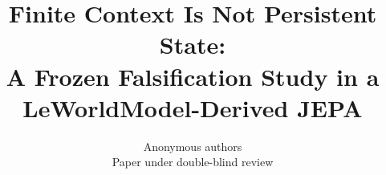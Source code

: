 \documentclass{article}
\title{Finite Context Is Not Persistent State:\\
A Frozen Falsification Study in a\\
LeWorldModel-Derived JEPA}
\author{Anonymous authors\\ Paper under double-blind review}
\begin{document}
\maketitle

\begin{abstract}

\end{abstract}



\label{v18-main-end}
\clearpage




\end{document}
